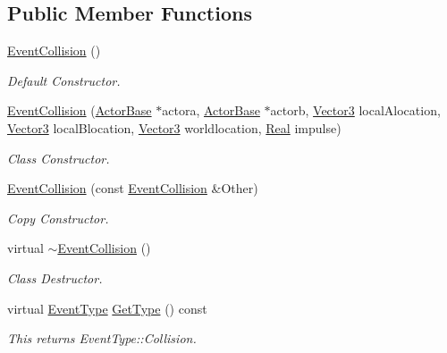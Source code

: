 \subsection*{Public Member Functions}
\begin{DoxyCompactItemize}
\item 
\hypertarget{classphys_1_1EventCollision_af44ef170326f56879e9e4608984a4196}{
\hyperlink{classphys_1_1EventCollision_af44ef170326f56879e9e4608984a4196}{EventCollision} ()}
\label{dd/de9/classphys_1_1EventCollision_af44ef170326f56879e9e4608984a4196}

\begin{DoxyCompactList}\small\item\em Default Constructor. \item\end{DoxyCompactList}\item 
\hyperlink{classphys_1_1EventCollision_a0f5a0862cde3b7db4482be6984434742}{EventCollision} (\hyperlink{classphys_1_1ActorBase}{ActorBase} $\ast$actora, \hyperlink{classphys_1_1ActorBase}{ActorBase} $\ast$actorb, \hyperlink{classphys_1_1Vector3}{Vector3} localAlocation, \hyperlink{classphys_1_1Vector3}{Vector3} localBlocation, \hyperlink{classphys_1_1Vector3}{Vector3} worldlocation, \hyperlink{namespacephys_af7eb897198d265b8e868f45240230d5f}{Real} impulse)
\begin{DoxyCompactList}\small\item\em Class Constructor. \item\end{DoxyCompactList}\item 
\hyperlink{classphys_1_1EventCollision_a85c999154866380d232ddcdfd9534c85}{EventCollision} (const \hyperlink{classphys_1_1EventCollision}{EventCollision} \&Other)
\begin{DoxyCompactList}\small\item\em Copy Constructor. \item\end{DoxyCompactList}\item 
virtual \hyperlink{classphys_1_1EventCollision_afcbf057fc955ce6c05b21c08325b1822}{$\sim$EventCollision} ()
\begin{DoxyCompactList}\small\item\em Class Destructor. \item\end{DoxyCompactList}\item 
virtual \hyperlink{classphys_1_1EventBase_a5e6a8564e127f654123f0bf6a2751923}{EventType} \hyperlink{classphys_1_1EventCollision_a96c2809f1bbab78b9f2758cea15a9a36}{GetType} () const 
\begin{DoxyCompactList}\small\item\em This returns EventType::Collision. \item\end{DoxyCompactList}\end{DoxyCompactItemize}
